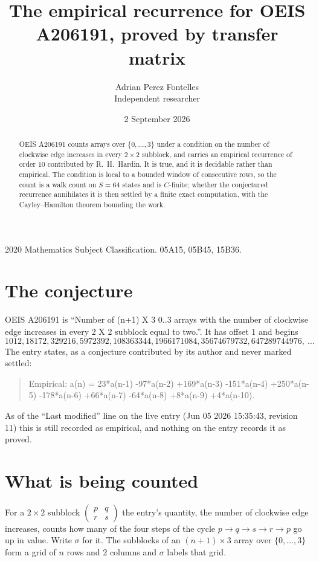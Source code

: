 \documentclass[11pt,a4paper]{article}
\title{The empirical recurrence for OEIS A206191, proved by transfer matrix}
\author{Adrian Perez Fontelles\\ \small Independent researcher}
\date{2 September 2026}
\theoremstyle{plain}
\theoremstyle{definition}
\begin{document}
\maketitle

\begin{abstract}
OEIS A206191 counts arrays over $\{0,\dots,3\}$ under a condition on the number of clockwise edge increases
in every $2\times2$ subblock, and carries an empirical recurrence of order $10$ contributed by
R.~H.~Hardin. It is true, and it is decidable rather than empirical. The condition is local to
a bounded window of consecutive rows, so the count is a walk count on $S=64$ states and is
$C$-finite; whether the conjectured recurrence annihilates it is then settled by a finite exact
computation, with the Cayley--Hamilton theorem bounding the work.
\end{abstract}

\noindent\small 2020 Mathematics Subject Classification. 05A15, 05B45, 15B36.\normalsize

\section{The conjecture}

OEIS A206191 is ``Number of (n+1) X 3 0..3 arrays with the number of clockwise edge increases in every 2 X 2 subblock equal to two.''. It has offset $1$ and begins
\[
1012, 18172, 329216, 5972392, 108363344, 1966171084, 35674679732, 647289744976,\ \dots
\]
The entry states, as a conjecture contributed by its author and never marked settled:
\begin{quote}
Empirical: a(n) = 23*a(n-1) -97*a(n-2) +169*a(n-3) -151*a(n-4) +250*a(n-5) -178*a(n-6) +66*a(n-7) -64*a(n-8) +8*a(n-9) +4*a(n-10).
\end{quote}
As of the ``Last modified'' line on the live entry (Jun 05 2026 15:35:43, revision 11) this is still
recorded as empirical, and nothing on the entry records it as proved.

\section{What is being counted}

For a $2\times2$ subblock $\begin{pmatrix}p&q\\r&s\end{pmatrix}$ the
entry's quantity, the number of clockwise edge increases, counts how many of the four steps of the cycle $p\to q\to s\to r\to p$ go up in value. Write $\sigma$ for it. The subblocks of an
$(n+1)\times3$ array over $\{0,\dots,3\}$ form a grid of $n$ rows and $2$
columns and $\sigma$ labels that grid.
\end{document}
